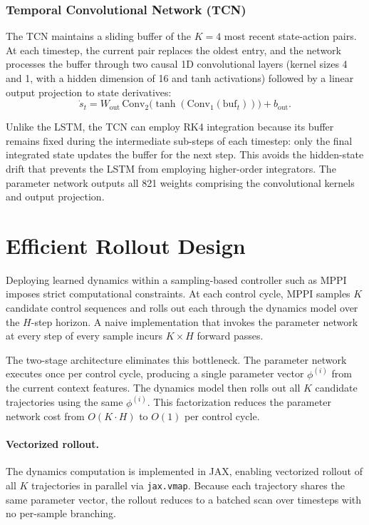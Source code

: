 \subsubsection{Temporal Convolutional Network (TCN)}
\label{sec:tcn}

The TCN maintains a sliding buffer of the $K = 4$ most recent state-action pairs. At each timestep, the current pair replaces the oldest entry, and the network processes the buffer through two causal 1D convolutional layers (kernel sizes 4 and 1, with a hidden dimension of 16 and tanh activations) followed by a linear output projection to state derivatives:
\begin{equation}
  \dot{s}_t = W_{\text{out}}\, \text{Conv}_2\!\big(\tanh(\text{Conv}_1(\text{buf}_t))\big) + b_{\text{out}}.
\end{equation}

Unlike the LSTM, the TCN can employ RK4 integration because its buffer remains fixed during the intermediate sub-steps of each timestep: only the final integrated state updates the buffer for the next step. This avoids the hidden-state drift that prevents the LSTM from employing higher-order integrators. The parameter network outputs all 821 weights comprising the convolutional kernels and output projection.

\section{Efficient Rollout Design}
\label{sec:efficient-rollout}

Deploying learned dynamics within a sampling-based controller such as MPPI imposes strict computational constraints. At each control cycle, MPPI samples $K$ candidate control sequences and rolls out each through the dynamics model over the $H$-step horizon. A naive implementation that invokes the parameter network at every step of every sample incurs $K \times H$ forward passes.

The two-stage architecture eliminates this bottleneck. The parameter network executes once per control cycle, producing a single parameter vector $\phi^{(i)}$ from the current context features. The dynamics model then rolls out all $K$ candidate trajectories using the same $\phi^{(i)}$. This factorization reduces the parameter network cost from $O(K \cdot H)$ to $O(1)$ per control cycle.

\paragraph{Vectorized rollout.}
The dynamics computation is implemented in JAX, enabling vectorized rollout of all $K$ trajectories in parallel via \texttt{jax.vmap}. Because each trajectory shares the same parameter vector, the rollout reduces to a batched scan over timesteps with no per-sample branching.

